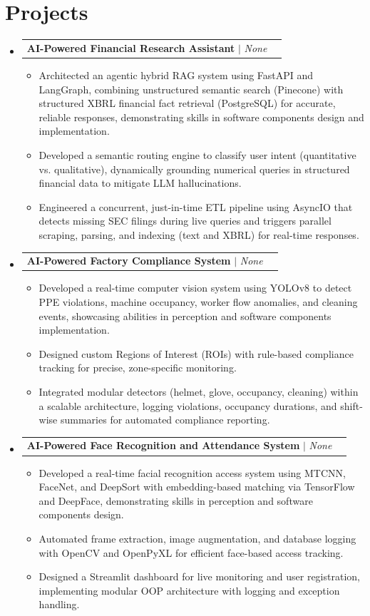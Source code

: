 \documentclass[letterpaper,11pt]{article}
\makeatletter
\newcommand{\resumeItem}[1]{
  \item\small{
    {#1 \vspace{-2pt}}
  }
}
\newcommand{\resumeProjectHeading}[2]{
    \item
    \begin{tabular*}{0.97\textwidth}{l@{\extracolsep{\fill}}r}
      \small#1 & #2 \\
    \end{tabular*}\vspace{-7pt}
}
\newcommand{\resumeSubHeadingListStart}{\begin{itemize}[leftmargin=0.15in, label={}]}
\newcommand{\resumeSubHeadingListEnd}{\end{itemize}}
\newcommand{\resumeItemListStart}{\begin{itemize}}
\newcommand{\resumeItemListEnd}{\end{itemize}\vspace{-5pt}}
\makeatother
\begin{document}
\section{Projects}
    \resumeSubHeadingListStart
            \resumeProjectHeading
          {\textbf{AI-Powered Financial Research Assistant} $|$ \emph{None}}{}
          \resumeItemListStart
                        \resumeItem{Architected an agentic hybrid RAG system using FastAPI and LangGraph, combining unstructured semantic search (Pinecone) with structured XBRL financial fact retrieval (PostgreSQL) for accurate, reliable responses, demonstrating skills in software components design and implementation.}
                        \resumeItem{Developed a semantic routing engine to classify user intent (quantitative vs. qualitative), dynamically grounding numerical queries in structured financial data to mitigate LLM hallucinations.}
                        \resumeItem{Engineered a concurrent, just-in-time ETL pipeline using AsyncIO that detects missing SEC filings during live queries and triggers parallel scraping, parsing, and indexing (text and XBRL) for real-time responses.}
                      \resumeItemListEnd
            \resumeProjectHeading
          {\textbf{AI-Powered Factory Compliance System} $|$ \emph{None}}{}
          \resumeItemListStart
                        \resumeItem{Developed a real-time computer vision system using YOLOv8 to detect PPE violations, machine occupancy, worker flow anomalies, and cleaning events, showcasing abilities in perception and software components implementation.}
                        \resumeItem{Designed custom Regions of Interest (ROIs) with rule-based compliance tracking for precise, zone-specific monitoring.}
                        \resumeItem{Integrated modular detectors (helmet, glove, occupancy, cleaning) within a scalable architecture, logging violations, occupancy durations, and shift-wise summaries for automated compliance reporting.}
                      \resumeItemListEnd
            \resumeProjectHeading
          {\textbf{AI-Powered Face Recognition and Attendance System} $|$ \emph{None}}{}
          \resumeItemListStart
                        \resumeItem{Developed a real-time facial recognition access system using MTCNN, FaceNet, and DeepSort with embedding-based matching via TensorFlow and DeepFace, demonstrating skills in perception and software components design.}
                        \resumeItem{Automated frame extraction, image augmentation, and database logging with OpenCV and OpenPyXL for efficient face-based access tracking.}
                        \resumeItem{Designed a Streamlit dashboard for live monitoring and user registration, implementing modular OOP architecture with logging and exception handling.}
                      \resumeItemListEnd
          \resumeSubHeadingListEnd
\end{document}
